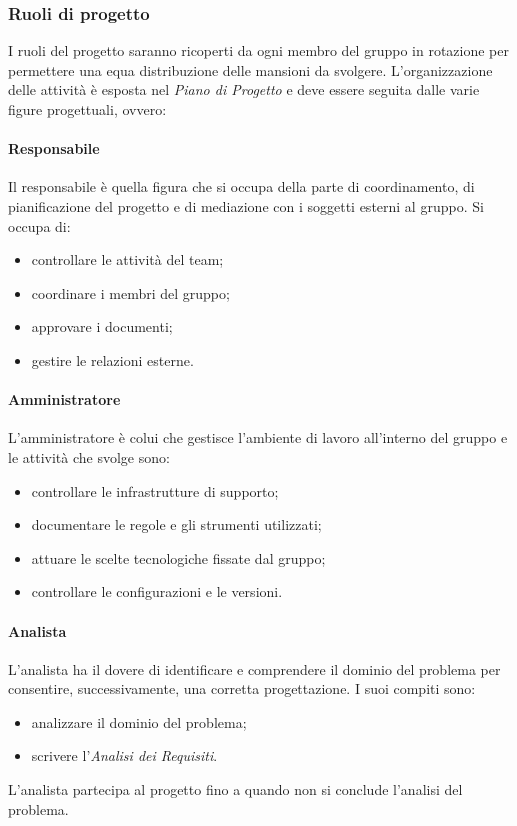 \subsubsection{Ruoli di progetto}
I ruoli del progetto saranno ricoperti da ogni membro del gruppo in rotazione per permettere
una equa distribuzione delle mansioni da svolgere. L'organizzazione delle attività
è esposta nel \emph{Piano di Progetto} e deve essere seguita dalle varie figure progettuali, ovvero:

\paragraph{Responsabile} \hfill \break
Il responsabile è quella figura che si occupa della parte di coordinamento, di pianificazione del progetto 
e di mediazione con i soggetti esterni al gruppo. Si occupa di:
\begin{itemize}
    \item controllare le attività del team;
    \item coordinare i membri del gruppo;
    \item approvare i documenti;
    \item gestire le relazioni esterne.
\end{itemize}

\paragraph{Amministratore} \hfill \break
L'amministratore è colui che gestisce l'ambiente di lavoro all'interno del gruppo e le attività che svolge sono:
\begin{itemize}
    \item controllare le infrastrutture di supporto;
    \item documentare le regole e gli strumenti utilizzati;
    \item attuare le scelte tecnologiche fissate dal gruppo;
    \item controllare le configurazioni e le versioni.
\end{itemize}

\paragraph{Analista} \hfill \break
L'analista ha il dovere di identificare e comprendere il dominio del problema per consentire, successivamente,
una corretta progettazione. I suoi compiti sono:
\begin{itemize}
    \item analizzare il dominio del problema;
    \item scrivere l'\emph{Analisi dei Requisiti}.
\end{itemize}
L'analista partecipa al progetto fino a quando non si conclude l'analisi del problema.

